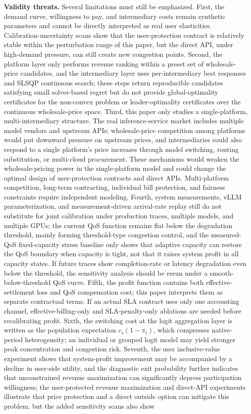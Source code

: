 \documentclass[11pt,a4paper]{article}
\begin{document}
\textbf{Validity threats.} Several limitations must still be emphasized. First, the demand curve, willingness to pay, and intermediary costs remain synthetic parameters and cannot be directly interpreted as real user elasticities. Calibration-uncertainty scans show that the user-protection contract is relatively stable within the perturbation range of this paper, but the direct API, under high-demand pressure, can still create new congestion points. Second, the platform layer only performs revenue ranking within a preset set of wholesale-price candidates, and the intermediary layer uses per-intermediary best responses and SLSQP continuous search; these steps return reproducible candidates satisfying small solver-based regret but do not provide global-optimality certificates for the non-convex problem or leader-optimality certificates over the continuous wholesale-price space. Third, this paper only studies a single-platform, multi-intermediary structure. The real inference-service market includes multiple model vendors and upstream APIs; wholesale-price competition among platforms would put downward pressure on upstream prices, and intermediaries could also respond to a single platform's price increases through model switching, routing substitution, or multi-cloud procurement. These mechanisms would weaken the wholesale-pricing power in the single-platform model and could change the optimal design of user-protection contracts and direct APIs. Multi-platform competition, long-term contracting, individual bill protection, and fairness constraints require independent modeling. Fourth, system measurements, vLLM parameterization, and measurement-driven arrival-rate replay still do not substitute for joint calibration under production traces, multiple models, and multiple GPUs; the current QoS function remains flat below the degradation threshold, mainly forming threshold-type congestion control, and the measured-QoS fixed-capacity stress baseline only shows that adaptive capacity can restore the QoS boundary when capacity is tight, not that it raises system profit in all capacity states. If future traces show completion-rate or latency degradation even below the threshold, the sensitivity analysis should be rerun under a smooth-below-threshold QoS curve. Fifth, the profit function contains both effective-settlement loss and QoS compensation cost; this paper interprets them as separate contractual terms. If an actual SLA contract uses only one accounting channel, effective-billing-only and SLA-penalty-only ablations are needed before recalibrating profit. Sixth, the switching cost at the logit aggregation layer is written as the population expectation $c_s(1-\pi_t)$, which compresses native-period heterogeneity; an individual or grouped logit model may yield stronger peak concentration and congestion risk. Seventh, the user inclusive-value experiment shows that system-profit improvement may be accompanied by a decline in user-side utility, and the diagnostic exit probability further indicates that unconstrained revenue maximization can significantly depress participation willingness; the user-protected revenue maximization and direct-API experiments illustrate that price protection and a direct outside option can mitigate this problem, but the added sensitivity scans also show 
\end{document}
